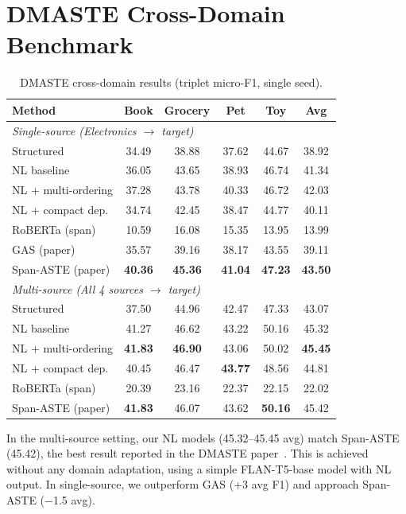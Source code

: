\documentclass[12pt,a4paper]{report}
\begin{document}
\section{DMASTE Cross-Domain Benchmark}\label{sec:dmaste}

\begin{table}[H]
\centering
\caption{DMASTE cross-domain results (triplet micro-F1, single seed).}
\label{tab:dmaste}
\small
\begin{tabular}{@{}lccccc@{}}
\toprule
\textbf{Method} & \textbf{Book} & \textbf{Grocery} & \textbf{Pet} & \textbf{Toy} & \textbf{Avg} \\
\midrule
\multicolumn{6}{l}{\textit{Single-source (Electronics $\rightarrow$ target)}} \\
\midrule
Structured & 34.49 & 38.88 & 37.62 & 44.67 & 38.92 \\
NL baseline & 36.05 & 43.65 & 38.93 & 46.74 & 41.34 \\
NL + multi-ordering & 37.28 & 43.78 & 40.33 & 46.72 & 42.03 \\
NL + compact dep. & 34.74 & 42.45 & 38.47 & 44.77 & 40.11 \\
RoBERTa (span) & 10.59 & 16.08 & 15.35 & 13.95 & 13.99 \\
\midrule
GAS (paper) & 35.57 & 39.16 & 38.17 & 43.55 & 39.11 \\
Span-ASTE (paper) & \textbf{40.36} & \textbf{45.36} & \textbf{41.04} & \textbf{47.23} & \textbf{43.50} \\
\midrule
\multicolumn{6}{l}{\textit{Multi-source (All 4 sources $\rightarrow$ target)}} \\
\midrule
Structured & 37.50 & 44.96 & 42.47 & 47.33 & 43.07 \\
NL baseline & 41.27 & 46.62 & 43.22 & 50.16 & 45.32 \\
NL + multi-ordering & \textbf{41.83} & \textbf{46.90} & 43.06 & 50.02 & \textbf{45.45} \\
NL + compact dep. & 40.45 & 46.47 & \textbf{43.77} & 48.56 & 44.81 \\
RoBERTa (span) & 20.39 & 23.16 & 22.37 & 22.15 & 22.02 \\
\midrule
Span-ASTE (paper) & \textbf{41.83} & 46.07 & 43.62 & \textbf{50.16} & 45.42 \\
\bottomrule
\end{tabular}
\end{table}

In the multi-source setting, our NL models (45.32--45.45 avg) match Span-ASTE (45.42), the best result reported in the DMASTE paper~\cite{xu2023dmaste}. This is achieved without any domain adaptation, using a simple FLAN-T5-base model with NL output. In single-source, we outperform GAS (+3 avg F1) and approach Span-ASTE ($-$1.5 avg).
\end{document}
